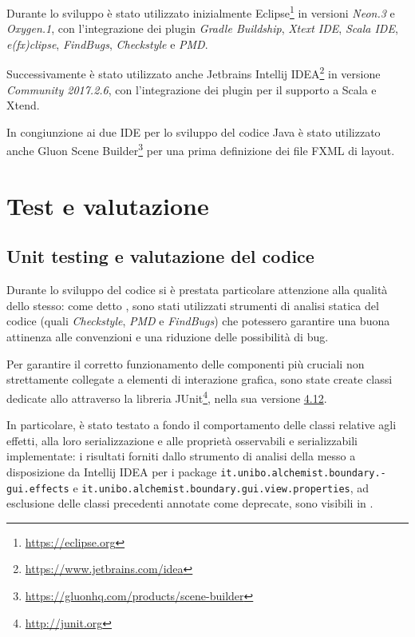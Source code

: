                 Durante lo sviluppo è stato utilizzato inizialmente Eclipse\footnote{\url{https://eclipse.org}} in versioni \textit{Neon.3} e \textit{Oxygen.1}, con l'integrazione dei plugin \emph{Gradle Buildship}, \emph{Xtext IDE}, \emph{Scala IDE}, \emph{e(fx)clipse}, \emph{FindBugs}, \emph{Checkstyle} e \emph{PMD}.

                Successivamente è stato utilizzato anche Jetbrains Intellij IDEA\footnote{\url{https://www.jetbrains.com/idea}} in versione \textit{Community 2017.2.6}, con l'integrazione dei plugin per il supporto a Scala e Xtend.

                In congiunzione ai due IDE per lo sviluppo del codice Java è stato utilizzato anche Gluon Scene Builder\footnote{\url{https://gluonhq.com/products/scene-builder}} per una prima definizione dei file FXML di layout.

        \section{Test e valutazione}\label{sec:test}
            \subsection{Unit testing e valutazione del codice}\label{subsec:junit}
                Durante lo sviluppo del codice si è prestata particolare attenzione alla qualità dello stesso: come detto , sono stati utilizzati strumenti di analisi statica del codice (quali \emph{Checkstyle}, \emph{PMD} e \emph{FindBugs}) che potessero garantire una buona attinenza alle convenzioni e una riduzione delle possibilità di bug.

                Per garantire il corretto funzionamento delle componenti più cruciali non strettamente collegate a elementi di interazione grafica, sono state create classi dedicate allo  attraverso la libreria JUnit\footnote{\url{http://junit.org}}, nella sua versione \href{http://junit.org/junit4/}{4.12}.

                In particolare, è stato testato a fondo il comportamento delle classi relative agli effetti, alla loro serializzazione e alle proprietà osservabili e serializzabili implementate: i risultati forniti dallo strumento di analisi della  messo a disposizione da Intellij IDEA per i package \texttt{it\dothyp unibo\dothyp alchemist\dothyp boundary\dothyp gui\dothyp effects} e \texttt{it\dothyp unibo\dothyp alchemist\dothyp boundary\dothyp gui\dothyp view\dothyp properties}, ad esclusione delle classi precedenti annotate come deprecate, sono visibili in .

